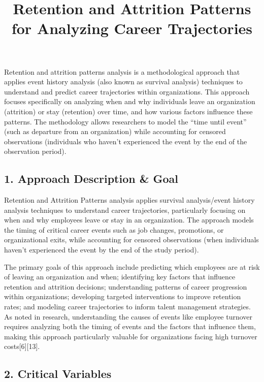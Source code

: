 \documentclass[
  letterpaper,
  DIV=11,
  numbers=noendperiod]{scrartcl}
\title{Retention and Attrition Patterns for Analyzing Career
Trajectories}
\author{}
\date{}
\begin{document}
\maketitle


Retention and attrition patterns analysis is a methodological approach
that applies event history analysis (also known as survival analysis)
techniques to understand and predict career trajectories within
organizations. This approach focuses specifically on analyzing when and
why individuals leave an organization (attrition) or stay (retention)
over time, and how various factors influence these patterns. The
methodology allows researchers to model the ``time until event'' (such
as departure from an organization) while accounting for censored
observations (individuals who haven't experienced the event by the end
of the observation period).

\subsection{1. Approach Description \&
Goal}\label{approach-description-goal}

Retention and Attrition Patterns analysis applies survival
analysis/event history analysis techniques to understand career
trajectories, particularly focusing on when and why employees leave or
stay in an organization. The approach models the timing of critical
career events such as job changes, promotions, or organizational exits,
while accounting for censored observations (when individuals haven't
experienced the event by the end of the study period).

The primary goals of this approach include predicting which employees
are at risk of leaving an organization and when; identifying key factors
that influence retention and attrition decisions; understanding patterns
of career progression within organizations; developing targeted
interventions to improve retention rates; and modeling career
trajectories to inform talent management strategies. As noted in
research, understanding the causes of events like employee turnover
requires analyzing both the timing of events and the factors that
influence them, making this approach particularly valuable for
organizations facing high turnover costs{[}6{]}{[}13{]}.

\subsection{2. Critical Variables}\label{critical-variables}
\end{document}
